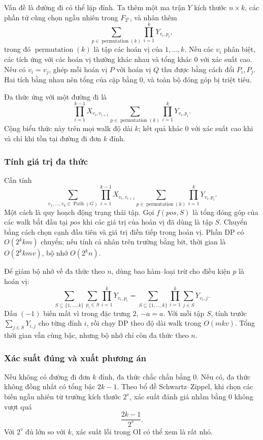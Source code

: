 \documentclass[11pt]{article}
\begin{document}
Vấn đề là đường đi có thể lặp đỉnh. Ta thêm một ma trận \(Y\) kích thước
\(n\times k\), các phần tử cũng chọn ngẫu nhiên trong \(F_{2^v}\), và nhân thêm
\[
  \sum_{p\in \operatorname{permutation}(k)}
  \prod_{i=1}^k Y_{v_i,p_i},
\]
trong đó \(\operatorname{permutation}(k)\) là tập các hoán vị của \(1,\ldots,k\).
Nếu các \(v_i\) phân biệt, các tích ứng với các hoán vị thường khác nhau và tổng
khác \(0\) với xác suất cao. Nếu có \(v_i=v_j\), ghép mỗi hoán vị \(P\) với
hoán vị \(Q\) thu được bằng cách đổi \(P_i,P_j\). Hai tích bằng nhau nên tổng
của cặp bằng \(0\), và toàn bộ đóng góp bị triệt tiêu.

Đa thức ứng với một đường đi là
\[
  \prod_{i=1}^{k-1} X_{v_i,v_{i+1}}
  \sum_{p\in \operatorname{permutation}(k)}
  \prod_{i=1}^k Y_{v_i,p_i}.
\]
Cộng biểu thức này trên mọi walk độ dài \(k\); kết quả khác \(0\) với xác suất
cao khi và chỉ khi tồn tại đường đi đơn \(k\) đỉnh.

\subsubsection{Tính giá trị đa thức}

Cần tính
\[
  \sum_{v_1,\ldots,v_k\in \operatorname{Path}(G)}
  \prod_{i=1}^{k-1} X_{v_i,v_{i+1}}
  \sum_{p\in \operatorname{permutation}(k)}
  \prod_{i=1}^k Y_{v_i,p_i}.
\]
Một cách là quy hoạch động trạng thái tập. Gọi \(f(\mathit{pos},S)\) là tổng
đóng góp của các walk bắt đầu tại \(\mathit{pos}\) khi các giá trị của hoán vị
đã dùng là tập \(S\). Chuyển bằng cách chọn cạnh đầu tiên và giá trị điền tiếp
trong hoán vị. Phần DP có \(O(2^k km)\) chuyển; nếu tính cả nhân trên trường
bằng bit, thời gian là \(O(2^k kmv)\), bộ nhớ \(O(2^k n)\).

Để giảm bộ nhớ về đa thức theo \(n\), dùng bao hàm--loại trừ cho điều kiện
\(p\) là hoán vị:
\[
  \sum_{S\subseteq \{1,\ldots,k\}}
  \sum_{p_i\in S}
  \prod_{i=1}^k Y_{v_i,p_i}
  =
  \sum_{S\subseteq \{1,\ldots,k\}}
  \prod_{i=1}^k\sum_{j\in S}Y_{v_i,j}.
\]
Dấu \((-1)\) biến mất vì trong đặc trưng \(2\), \(-a=a\). Với mỗi tập \(S\),
tính trước \(\sum_{j\in S}Y_{i,j}\) cho từng đỉnh \(i\), rồi chạy DP theo độ
dài walk trong \(O(mkv)\). Tổng thời gian vẫn cùng bậc, nhưng bộ nhớ chỉ còn đa
thức theo \(n\).

\subsubsection{Xác suất đúng và xuất phương án}

Nếu không có đường đi đơn \(k\) đỉnh, đa thức chắc chắn bằng \(0\). Nếu có, đa
thức không đồng nhất có tổng bậc \(2k-1\). Theo bổ đề Schwartz--Zippel, khi
chọn các biến ngẫu nhiên từ trường kích thước \(2^v\), xác suất đánh giá nhầm
bằng \(0\) không vượt quá
\[
  \frac{2k-1}{2^v}.
\]
Với \(2^v\) đủ lớn so với \(k\), xác suất lỗi trong OI có thể xem là rất nhỏ.
\end{document}
